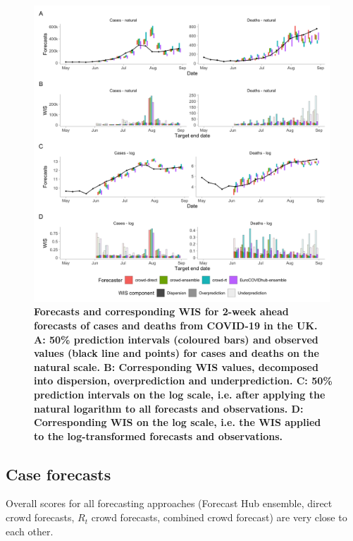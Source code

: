 \documentclass[10pt,a4paper,twocolumn]{article}
\begin{document}
\begin{figure}
\centering
\includegraphics[width=0.99\textwidth]{../output/figures/scores-and-forecasts.png}
\caption{\bf{Forecasts and corresponding WIS for 2-week ahead forecasts of cases and deaths from COVID-19 in the UK.} A: 50\% prediction intervals (coloured bars) and observed values (black line and points) for cases and deaths on the natural scale. B: Corresponding WIS values, decomposed into dispersion, overprediction and underprediction. C: 50\% prediction intervals on the log scale, i.e. after applying the natural logarithm to all forecasts and observations. D: Corresponding WIS on the log scale, i.e. the WIS applied to the log-transformed forecasts and observations.} 
\label{fig:forecasts-scores} 
\end{figure}

\subsection*{Case forecasts}

Overall scores for all forecasting approaches (Forecast Hub ensemble, direct crowd forecasts, $R_t$ crowd forecasts, combined crowd forecast) are very close to each other. 
\end{document}
